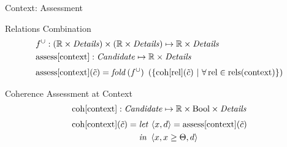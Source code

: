 \begin{frame}{Context: Assessment}
  \begin{block}{Relations Combination}
    \begin{align*}
      & f^\cup: (\mathbb{R} \times \mathit{Details}) \times
                (\mathbb{R} \times \mathit{Details})
         \mapsto \mathbb{R} \times \mathit{Details} \\
      & \mathrm{assess}[\mathrm{context}]: \mathit{Candidate} \mapsto
                                           \mathbb{R} \times \mathit{Details}
      \\[0.3em]
      & \mathrm{assess}[\mathrm{context}](\tilde{c}) =
        \mathit{fold}\, (f^\cup) ~ \left(
        \lbrace \mathrm{coh}[\mathrm{rel}](\tilde{c}) ~|~
                \forall\, \mathrm{rel} \in \mathrm{rels}(\mathrm{context})
        \rbrace\right)
    \end{align*}
  \end{block}
  \begin{block}{Coherence Assessment at Context}
    \begin{align*}
      & \mathrm{coh}[\mathrm{context}]: \mathit{Candidate} \mapsto \mathbb{R} \times
                                \mathrm{Bool} \times \mathit{Details}
      \\[0.3em]
      & \mathrm{coh}[\mathrm{context}](\tilde{c}) =
          \begin{aligned}[t] & \mathit{let}\,  \left<x,d\right> = \mathrm{assess}[\mathrm{context}](\tilde{c})  \\& \mathit{in}~ \left<x, x \geq \Theta, d\right> \end{aligned}
    \end{align*}
  \end{block}
\end{frame}




